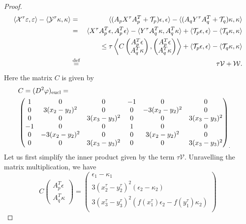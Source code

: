 \documentclass[reqno]{amsart}
\newcommand{\eucl}{\operatorname{eucl}}
\begin{document}
\begin{proof}
\begin{eqnarray*}
\langle \mathcal{X}^\tau\varepsilon,\varepsilon\rangle-\langle \mathcal{Y}^\tau\kappa,\kappa\rangle
&=& \langle(A_pX^\tau A^T_p+\mathcal{T}_p)\epsilon,\epsilon\rangle-\langle(A_qY^\tau A^T_q+\mathcal{T}_q)\kappa,\kappa\rangle\\
&=&\langle X^\tau A^T_p\epsilon,A^T_p\epsilon\rangle-\langle Y^\tau A^T_q\kappa,A^T_q\kappa\rangle+\langle \mathcal{T}_p\epsilon,\epsilon\rangle-\langle \mathcal{T}_q\kappa,\kappa\rangle\\
& &\leq\tau\left\langle C
\begin{pmatrix} A^T_p\epsilon\\A^T_q\kappa \end{pmatrix},
\begin{pmatrix} A^T_p\epsilon\\A^T_q\kappa \end{pmatrix}\right\rangle +\langle \mathcal{T}_p\epsilon,\epsilon\rangle-\langle \mathcal{T}_q\kappa,\kappa\rangle \\
 & \stackrel{\textmd{def}}{=} & \tau\mathcal{V}+\mathcal{W}. 
\end{eqnarray*}
Here the matrix $C$ is given by 
\begin{eqnarray*}
\lefteqn{C=(D^2\varphi)_{\eucl}=}& & \\
& \begin{pmatrix}
1& 0 & 0 &-1 & 0 & 0 \\
0& 3(x_2-y_2)^2 & 0 & 0 & -3(x_2-y_2)^2 & 0 \\
0& 0 & 3(x_3-y_3)^2 & 0 & 0 & 3(x_3-y_3)^2 \\
-1& 0 & 0 & 1 & 0 & 0 \\
0 & -3(x_2-y_2)^2 & 0 & 0& 3(x_2-y_2)^2 & 0 \\
 0 & 0 & 3(x_3-y_3)^2 & 0& 0 & 3(x_3-y_3)^2 
\end{pmatrix}_. 
\end{eqnarray*}
Let us first simplify the inner product given by the term $\tau\mathcal{V}$. 
Unravelling the matrix multiplication, we have 
\begin{equation*}
C \begin{pmatrix} A^T_p\epsilon\\A^T_q\kappa \end{pmatrix} = 
\begin{pmatrix}
\epsilon_1-\kappa_1\\
 3(x_2^\tau-y_2^\tau)^2 (\epsilon_2-\kappa_2)\\
 3(x_3^\tau-y_3^\tau)^2(f(x_1^\tau)\epsilon_2-f(y_1^\tau)\kappa_2)\\

\end{pmatrix}
\end{equation*}
\end{proof}
\end{document}
